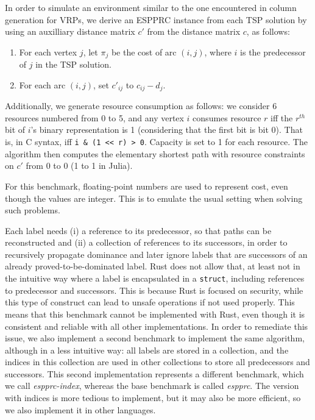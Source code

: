 \documentclass[11pt,a4paper,notitlepage]{article}
\begin{document}
In order to simulate an environment similar to the one encountered in
column generation for VRPs, we derive an ESPPRC instance from each TSP
solution by using an auxilliary distance matrix $c'$ from the
distance matrix $c$, as follows:
\begin{enumerate}
\item For each vertex $j$, let $\pi_j$ be the cost of arc $(i, j)$,
  where $i$ is the predecessor of $j$ in the TSP solution.
\item For each arc $(i, j)$, set $c'_{ij}$ to $c_{ij} - d_j$.
\end{enumerate}
Additionally, we generate resource consumption as follows: we consider
6 resources numbered from 0 to 5, and any vertex $i$ consumes resource
$r$ iff the $r^{th}$ bit of $i$'s binary representation is 1
(considering that the first bit is bit 0). That is, in C syntax, iff
\verb|i & (1 << r) > 0|. Capacity is set to 1 for each resource.
The algorithm then computes the elementary shortest path with resource
constraints on $c'$ from 0 to 0 (1 to 1 in Julia).

For this benchmark, floating-point numbers are used to represent cost,
even though the values are integer. This is to emulate the usual
setting when solving such problems.

Each label needs (i) a reference to its predecessor, so that
paths can be reconstructed and (ii) a collection of references to
its successors, in order to recursively propagate dominance and later
ignore labels that are successors of an already proved-to-be-dominated
label. Rust does not allow that, at least not in the intuitive way
where a label is encapsulated in a \verb|struct|, including references
to predecessor and successors. This is because Rust is focused on
security, while this type of construct can lead to unsafe operations if
not used properly. This means that this benchmark cannot be
implemented with Rust, even though it is consistent and reliable with all
other implementations. In order to remediate this issue, we also
implement a second benchmark to implement the same algorithm, although
in a less intuitive way: all labels are stored in a collection, and
the indices in this collection are used in other collections to store all
predecessors and successors. This second implementation represents a
different benchmark, which we call \emph{espprc-index}, whereas the
base benchmark is called \emph{espprc}. The version with indices is more
tedious to implement, but it may also be more efficient, so we also
implement it in other languages.
\end{document}
